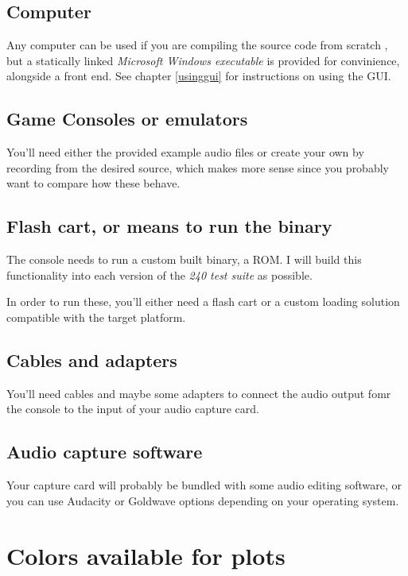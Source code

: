 \documentclass[10pt,a4paper]{report}
\begin{document}
\begin{appendices}
\section{Computer}

Any computer can be used if you are compiling the source code from scratch \cite{sourcecode}, but a statically linked \textit{Microsoft Windows executable} is provided for convinience, alongside a front end. See chapter \ref{usinggui} for instructions on using the GUI.

\section{Game Consoles or emulators}

You'll need either the provided example audio files or create your own by recording from the desired source, which makes more sense since you probably want to compare how these behave.

\section{Flash cart, or means to run the binary}

The console needs to run a custom built binary, a ROM. I will build this functionality into each version of the \textit{240 test suite} \cite{240pSuite} as possible.

In order to run these, you'll either need a flash cart or a custom loading solution compatible with the target platform.

\section{Cables and adapters}

You'll need cables and maybe some adapters to connect the audio output fomr the console to the input of your audio capture card.

\section{Audio capture software}

Your capture card will probably be bundled with some audio editing software, or you can use  Audacity \cite{audacity} or Goldwave \cite{goldwave} options depending on your operating system.

\chapter{Colors available for plots}
\label{availablecolors}


\end{appendices}
\end{document}
